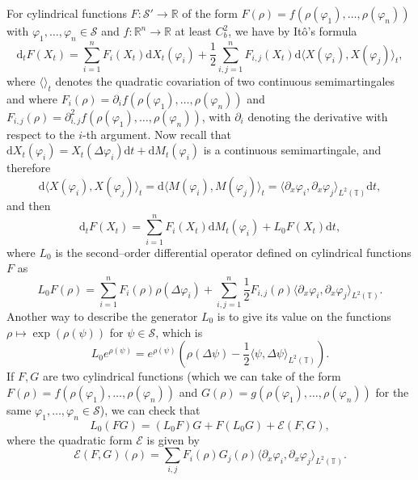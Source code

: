 \documentclass[a4paper,11pt]{article}
\newcommand{\mathd}{\mathrm{d}}
\newcommand{\CS}{\mathscr{S}}
\begin{document}
For cylindrical functions $F : \CS' \rightarrow \mathbb{R}$ of the form $F
(\rho) = f (\rho (\varphi_1), \ldots, \rho (\varphi_n))$ with $\varphi_1,
\ldots, \varphi_n \in \CS$ and $f : \mathbb{R}^n \rightarrow \mathbb{R}$ at
least $C^2_b$, we have by It{\^o}'s formula
\[ \mathd_t F (X_t) = \sum_{i = 1}^n F_i (X_t) \mathd X_t (\varphi_i) +
   \frac{1}{2} \sum_{i, j = 1}^n F_{i, j} (X_t) \mathd \langle X (\varphi_i),
   X (\varphi_j) \rangle_t, \]
where $\langle \rangle_t$ denotes the quadratic covariation of two continuous
semimartingales and where $F_i (\rho) = \partial_i f (\rho (\varphi_1),
\ldots, \rho (\varphi_n))$ and $F_{i, j} (\rho) = \partial_{i, j}^2 f (\rho
(\varphi_1), \ldots, \rho (\varphi_n))$, with $\partial_i$ denoting the
derivative with respect to the $i$-th argument. Now recall that $\mathd X_t(\varphi_i) = X_t (\Delta \varphi_i) \mathd t + \mathd M_t(\varphi_i)$ is a continuous semimartingale, and therefore
\[ \mathd \langle X (\varphi_i), X (\varphi_j) \rangle_t = \mathd \langle M
   (\varphi_i), M (\varphi_j) \rangle_t = \langle \partial_x \varphi_i,
   \partial_x \varphi_j \rangle_{L^2 (\mathbb{T})} \mathd t, \]
and then
\[ \mathd_t F (X_t) = \sum_{i = 1}^n F_i (X_t) \mathd M_t (\varphi_i) + L_0 F
   (X_t) \mathd t, \]
where $L_0$ is the second--order differential operator defined on cylindrical
functions $F$ as
\begin{equation}
  L_0 F (\rho) = \sum_{i = 1}^n F_i (\rho) \rho (\Delta \varphi_i) + \sum_{i,
  j = 1}^n \frac{1}{2} F_{i, j} (\rho) \langle \partial_x \varphi_i,
  \partial_x \varphi_j \rangle_{L^2 (\mathbb{T})} .
\end{equation}
Another way to describe the generator $L_0$ is to give its value on the
functions $\rho \mapsto \exp (\rho (\psi))$ for $\psi \in \CS$, which is
\[ L_0 e^{\rho (\psi)} = e^{\rho (\psi)} (\rho (\Delta \psi) - \frac{1}{2}
   \langle \psi, \Delta \psi \rangle_{L^2 (\mathbb{T})}) . \]
If $F, G$ are two cylindrical functions (which we can take of the form $F
(\rho) = f (\rho (\varphi_1), \ldots, \rho (\varphi_n))$ and $G (\rho) = g
(\rho (\varphi_1), \ldots, \rho (\varphi_n))$ for the same $\varphi_1, \ldots,
\varphi_n \in \CS$), we can check that
\begin{equation}
  \label{eq:L0 and E} L_0 (F G) = (L_0 F) G + F (L_0 G) +\mathcal{E} (F, G),
\end{equation}
where the quadratic form $\mathcal{E}$ is given by
\begin{equation}
  \mathcal{E} (F, G) (\rho) = \sum_{i, j} F_i (\rho) G_j (\rho) \langle
  \partial_x \varphi_i, \partial_x \varphi_j \rangle_{L^2 (\mathbb{T})} .
\end{equation}
\end{document}

